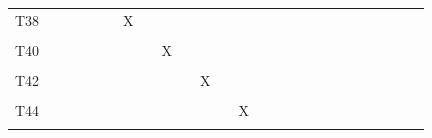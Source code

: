 \documentclass[
]{article}
\begin{document}
\begin{longtable}[l]{lllllllllllllllllllllllll}
T38 &  &  &  &  &  & X &  &  &  &  &  &  &  &  &  &  &  &  &  &  &  &  &  & \\
\cellcolor{gray!6}{T39} & \cellcolor{gray!6}{} & \cellcolor{gray!6}{} & \cellcolor{gray!6}{} & \cellcolor{gray!6}{} & \cellcolor{gray!6}{} & \cellcolor{gray!6}{} & \cellcolor{gray!6}{X} & \cellcolor{gray!6}{} & \cellcolor{gray!6}{} & \cellcolor{gray!6}{} & \cellcolor{gray!6}{} & \cellcolor{gray!6}{} & \cellcolor{gray!6}{} & \cellcolor{gray!6}{} & \cellcolor{gray!6}{} & \cellcolor{gray!6}{} & \cellcolor{gray!6}{} & \cellcolor{gray!6}{} & \cellcolor{gray!6}{} & \cellcolor{gray!6}{} & \cellcolor{gray!6}{} & \cellcolor{gray!6}{} & \cellcolor{gray!6}{} & \cellcolor{gray!6}{}\\
T40 &  &  &  &  &  &  &  & X &  &  &  &  &  &  &  &  &  &  &  &  &  &  &  & \\
\addlinespace
\cellcolor{gray!6}{T41} & \cellcolor{gray!6}{} & \cellcolor{gray!6}{} & \cellcolor{gray!6}{} & \cellcolor{gray!6}{} & \cellcolor{gray!6}{} & \cellcolor{gray!6}{} & \cellcolor{gray!6}{} & \cellcolor{gray!6}{} & \cellcolor{gray!6}{X} & \cellcolor{gray!6}{} & \cellcolor{gray!6}{} & \cellcolor{gray!6}{} & \cellcolor{gray!6}{} & \cellcolor{gray!6}{} & \cellcolor{gray!6}{} & \cellcolor{gray!6}{} & \cellcolor{gray!6}{} & \cellcolor{gray!6}{} & \cellcolor{gray!6}{} & \cellcolor{gray!6}{} & \cellcolor{gray!6}{} & \cellcolor{gray!6}{} & \cellcolor{gray!6}{} & \cellcolor{gray!6}{}\\
T42 &  &  &  &  &  &  &  &  &  & X &  &  &  &  &  &  &  &  &  &  &  &  &  & \\
\cellcolor{gray!6}{T43} & \cellcolor{gray!6}{} & \cellcolor{gray!6}{} & \cellcolor{gray!6}{} & \cellcolor{gray!6}{} & \cellcolor{gray!6}{} & \cellcolor{gray!6}{} & \cellcolor{gray!6}{} & \cellcolor{gray!6}{} & \cellcolor{gray!6}{} & \cellcolor{gray!6}{} & \cellcolor{gray!6}{X} & \cellcolor{gray!6}{} & \cellcolor{gray!6}{} & \cellcolor{gray!6}{} & \cellcolor{gray!6}{} & \cellcolor{gray!6}{} & \cellcolor{gray!6}{} & \cellcolor{gray!6}{} & \cellcolor{gray!6}{} & \cellcolor{gray!6}{} & \cellcolor{gray!6}{} & \cellcolor{gray!6}{} & \cellcolor{gray!6}{} & \cellcolor{gray!6}{}\\
T44 &  &  &  &  &  &  &  &  &  &  &  & X &  &  &  &  &  &  &  &  &  &  &  & \\
\cellcolor{gray!6}{T45} & \cellcolor{gray!6}{} & \cellcolor{gray!6}{} & \cellcolor{gray!6}{} & \cellcolor{gray!6}{} & \cellcolor{gray!6}{} & \cellcolor{gray!6}{} & \cellcolor{gray!6}{} & \cellcolor{gray!6}{} & \cellcolor{gray!6}{} & \cellcolor{gray!6}{} & \cellcolor{gray!6}{} & \cellcolor{gray!6}{} & \cellcolor{gray!6}{X} & \cellcolor{gray!6}{} & \cellcolor{gray!6}{} & \cellcolor{gray!6}{} & \cellcolor{gray!6}{} & \cellcolor{gray!6}{} & \cellcolor{gray!6}{} & \cellcolor{gray!6}{} & \cellcolor{gray!6}{} & \cellcolor{gray!6}{} & \cellcolor{gray!6}{} & \cellcolor{gray!6}{}\\

\end{longtable}
\end{document}
